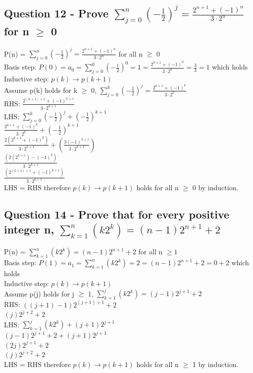\documentclass{article}
\begin{document}
\subsection{Question 12 - Prove $\sum_{j=0}^{n} (-\frac{1}{2})^j = \frac{2^{n+1} + (-1)^n}{3 \cdot 2^n}$ for n $\geq$ 0}

P(n) = $\sum_{j=0}^{n} (-\frac{1}{2})^j = \frac{2^{n+1} + (-1)^n}{3 \cdot 2^n}$ for all n $\geq$ 0\\
Basis step:
$P(0) = a_0 = \sum_{j=0}^{0} (-\frac{1}{2})^0 = 1 = \frac{2^{0+1} + (-1)^0}{3 \cdot 2^0} = \frac{3}{3} = 1$ which holds\\
Inductive step:
$p(k) \to p(k+1)$\\
Assume p(k) holds for k $\geq$ 0, $\sum_{j=0}^{k} (-\frac{1}{2})^j = \frac{2^{k+1} + (-1)^k}{3 \cdot 2^k}$\\
RHS: $\frac{2^{(k+1)+1} + (-1)^{k+1}}{3 \cdot 2^{k+1}}$\\
LHS: $\sum_{j=0}^{k} (-\frac{1}{2})^j + (-\frac{1}{2})^{k+1}$\\
$\frac{2^{k+1} + (-1)^k}{3 \cdot 2^k} + (-\frac{1}{2})^{k+1}$\\
$\frac{2(2^{k+1} + (-1)^k)}{3 \cdot 2^{k+1}} + (\frac{3(-1)^{k+1}}{3\cdot2^{k+1}})$\\
$\frac{(2(2^{k+1}) -(-1)^k)}{3 \cdot 2^{k+1}}$\\
$\frac{(2^{(k+1)+1} + (-1)^{k+1})}{3 \cdot 2^{k+1}}$\\
LHS = RHS therefore $p(k) \to p(k+1)$ holds for all n $\geq$ 0 by induction.

\subsection{Question 14 - Prove that for every positive integer n, $\sum_{k = 1}^{n} (k2^k) = (n-1)2^{n+1} + 2$}
P(n) = $\sum_{k = 1}^{n} (k2^k) = (n-1)2^{n+1} + 2$ for all n $\geq 1$\\
Basis step:
$P(1) = a_1 = \sum_{k = 1}^{n} (k2^k) = 2 = (n-1)2^{n+1} + 2 = 0 + 2 $ which holds\\
Inductive step:
$p(k) \to p(k+1)$\\
Assume p(j) holds for j $\geq$ 1, $\sum_{k = 1}^{j} (k2^k) = (j-1)2^{j+1} + 2$\\
RHS: $((j+1)-1)2^{(j+1)+1} + 2$\\
$(j)2^{j+2} + 2$\\
LHS: $\sum_{k = 1}^{j} (k2^k) + (j+1)2^{j+1}$\\
$(j-1)2^{j+1} + 2 + (j+1)2^{j+1}$\\
$(2j)2^{j+1} + 2$\\
$(j)2^{j+2} + 2$\\
LHS = RHS therefore $p(k) \to p(k+1)$ holds for all n $\geq$ 1 by induction.
\end{document}
